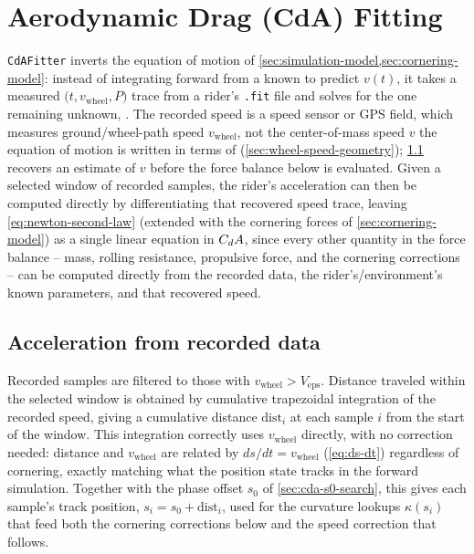 \section{Aerodynamic Drag (CdA) Fitting}
\label{sec:cda-fitting}

\nolinkurl{CdAFitter} inverts the equation of motion of
\cref{sec:simulation-model,sec:cornering-model}: instead of integrating forward
from a known \CdA{} to predict $v(t)$, it takes a measured $\bigl(t,
v_{\mathrm{wheel}}, P\bigr)$ trace from a rider's \nolinkurl{.fit} file and
solves for the one remaining unknown, \CdA{}. The recorded speed is a speed
sensor or GPS field, which measures ground/wheel-path speed
$v_{\mathrm{wheel}}$, not the center-of-mass speed $v$ the equation of motion
is written in terms of (\cref{sec:wheel-speed-geometry}); \cref{sec:cda-dvdt}
recovers an estimate of $v$ before the force balance below is evaluated.
Given a selected window of recorded samples, the rider's acceleration can then
be computed directly by differentiating that recovered speed trace, leaving
\cref{eq:newton-second-law} (extended with the cornering forces of
\cref{sec:cornering-model}) as a single linear equation in $C_{d}A$, since every
other quantity in the force balance -- mass, rolling resistance, propulsive
force, and the cornering corrections -- can be computed directly from the
recorded data, the rider's/environment's known parameters, and that recovered
speed.

\subsection{Acceleration from recorded data}
\label{sec:cda-dvdt}

Recorded samples are filtered to those with $v_{\mathrm{wheel}} >
V_{\mathrm{eps}}$. Distance traveled within the selected window is obtained by
cumulative trapezoidal integration of the recorded speed, giving a cumulative
distance $\mathrm{dist}_i$ at each sample $i$ from the start of the window.
This integration correctly uses $v_{\mathrm{wheel}}$ directly, with no
correction needed: distance and $v_{\mathrm{wheel}}$ are related by
$ds/dt = v_{\mathrm{wheel}}$ (\cref{eq:ds-dt}) regardless of cornering, exactly
matching what the position state tracks in the forward simulation. Together
with the phase offset $s_0$ of \cref{sec:cda-s0-search}, this gives each
sample's track position, $s_i = s_0 + \mathrm{dist}_i$, used for the curvature
lookups $\kappa(s_i)$ that feed both the cornering corrections below and the
speed correction that follows.

